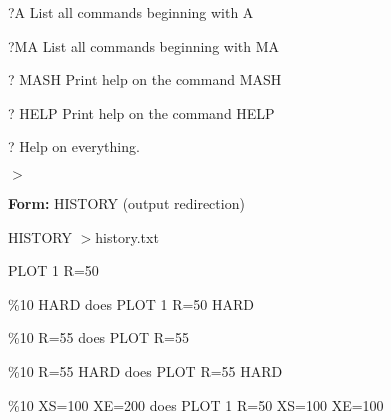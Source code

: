 {\newpage\clearpage
{}%
\begin{example}
  \item[?A\hfill]{List all commands beginning with A}
  \item[?MA\hfill]{List all commands beginning with MA}
\end{example}%
\lthtmlfigureZ
\lthtmlcheckvsize\clearpage}

{\newpage\clearpage
{}%
\begin{example}
  \item[? MASH\hfill]{Print help on the command MASH}
  \item[? HELP\hfill]{Print help on the command HELP}
  \item[?\hfill]{Help on everything.}
\end{example}%
\lthtmlfigureZ
\lthtmlcheckvsize\clearpage}

{\newpage\clearpage
{}%
$>$%
\lthtmlinlinemathZ
\lthtmlcheckvsize\clearpage}

{\newpage\clearpage
{}%
\begin{command}
  \item[\textbf{Form: }HISTORY (output redirection)]{}
\end{command}%
\lthtmlfigureZ
\lthtmlcheckvsize\clearpage}

{\newpage\clearpage
{}%
\begin{hanging}
  \item{HISTORY $>$history.txt}
\end{hanging}%
\lthtmlfigureZ
\lthtmlcheckvsize\clearpage}

{\newpage\clearpage
{}%
\begin{hanging}
  \item{PLOT 1 R=50}
\end{hanging}%
\lthtmlfigureZ
\lthtmlcheckvsize\clearpage}

{\newpage\clearpage
{}%
\begin{example}
  \item[\%10 HARD\hfill]{does PLOT 1 R=50 HARD}
  \item[\%10 R=55\hfill]{does PLOT R=55}
  \item[\%10 R=55 HARD\hfill]{does PLOT R=55 HARD}
  \item[\%10 XS=100 XE=200\hfill]{does PLOT 1 R=50 XS=100 XE=100}
\end{example}%
\lthtmlfigureZ
\lthtmlcheckvsize\clearpage}

